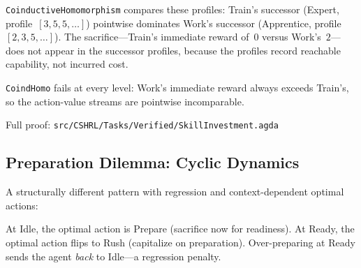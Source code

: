 \documentclass[runningheads]{llncs}
\newcommand{\fpath}[1]{\nolinkurl{#1}}
\begin{document}
\texttt{CoinductiveHomomorphism} compares these profiles: Train's successor (Expert, profile~$[3,5,5,\ldots]$) pointwise dominates Work's successor (Apprentice, profile~$[2,3,5,\ldots]$).  The sacrifice---Train's immediate reward of~$0$ versus Work's~$2$---does not appear in the successor profiles, because the profiles record reachable capability, not incurred cost.

\texttt{CoindHomo} fails at every level: Work's immediate reward always exceeds Train's, so the action-value streams are pointwise incomparable.

Full proof: \fpath{src/CSHRL/Tasks/Verified/SkillInvestment.agda}

\subsection{Preparation Dilemma: Cyclic Dynamics}

A structurally different pattern with regression and context-dependent optimal actions:

\begin{center}
\end{center}

\noindent At Idle, the optimal action is Prepare (sacrifice now for readiness).  At Ready, the optimal action flips to Rush (capitalize on preparation).  Over-preparing at Ready sends the agent \emph{back} to Idle---a regression penalty.
\end{document}
